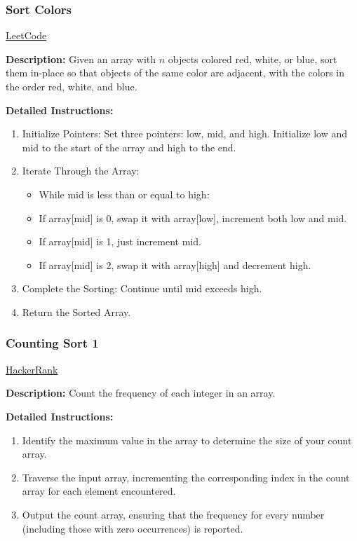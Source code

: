 \subsubsection{Sort Colors}
\href{https://leetcode.com/problems/sort-colors/description/}{LeetCode}

\textbf{Description:} Given an array with $n$ objects colored red, white, or blue, sort them in-place so that objects of the same color are adjacent, with the colors in the order red, white, and blue.

\textbf{Detailed Instructions:}
\begin{enumerate}
    \item Initialize Pointers: Set three pointers: low, mid, and high. Initialize low and mid to the start of the array and high to the end.
    \item Iterate Through the Array:
    \begin{itemize}
        \item While mid is less than or equal to high:
        \item If array[mid] is 0, swap it with array[low], increment both low and mid.
        \item If array[mid] is 1, just increment mid.
        \item If array[mid] is 2, swap it with array[high] and decrement high.
    \end{itemize}
    \item Complete the Sorting: Continue until mid exceeds high.
    \item Return the Sorted Array.
\end{enumerate}

\subsubsection{Counting Sort 1}
\href{https://www.hackerrank.com/challenges/one-week-preparation-kit-countingsort1/problem}{HackerRank}

\textbf{Description:} Count the frequency of each integer in an array.

\textbf{Detailed Instructions:}
\begin{enumerate}
    \item Identify the maximum value in the array to determine the size of your count array.
    \item Traverse the input array, incrementing the corresponding index in the count array for each element encountered.
    \item Output the count array, ensuring that the frequency for every number (including those with zero occurrences) is reported.
\end{enumerate}

